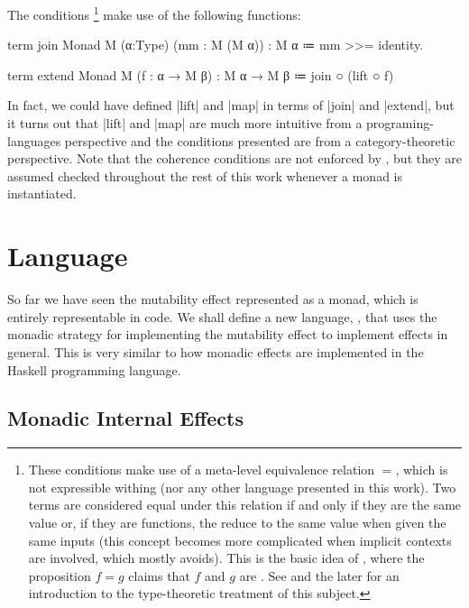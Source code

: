 The conditions%
\footnote{
  These conditions make use of a meta-level equivalence relation $=$, which is not expressible withing \LangC (nor any other language presented in this work).
  Two terms are considered equal under this relation if and only if they are the same value or, if they are functions, the reduce to the same value when given the same inputs (this concept becomes more complicated when implicit contexts are involved, which \LangC mostly avoids).
  This is the basic idea of , where the proposition $f = g$ claims that $f$ and $g$ are .
  See \cite{Awodey2004} and the later \cite{Wadler2015} for an introduction to the type-theoretic treatment of this subject.
}
make use of the following functions:
\begin{program}
term join {Monad M} (α:Type) (mm : M (M α)) : M α
  ≔ mm >>= identity.

term extend {Monad M} (f : α → M β) : M α → M β
  ≔ join ○ (lift ○ f)
\end{program}
In fact, we could have defined \code|lift| and \code|map| in terms of \code|join| and \code|extend|, but it turns out that \code|lift| and \code|map| are much more intuitive from a programing-languages perspective and the conditions presented are from a category-theoretic perspective.
Note that the coherence conditions are not enforced by \LangC, but they are assumed checked throughout the rest of this work whenever a monad is instantiated.

\section{Language \LangC}
\label{sec:LangC}

So far we have seen the mutability effect represented as a monad, which is entirely representable in \LangA code.
We shall define a new language, \LangC, that uses the monadic strategy for implementing the mutability effect to implement effects in general.
This is very similar to how monadic effects are implemented in the Haskell programming language.

\subsection{Monadic Internal Effects}

